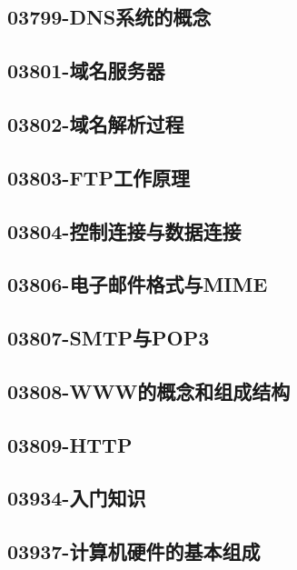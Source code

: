 \subsection{03799-DNS系统的概念}

\subsection{03801-域名服务器}

\subsection{03802-域名解析过程}

\subsection{03803-FTP工作原理}

\subsection{03804-控制连接与数据连接}

\subsection{03806-电子邮件格式与MIME}

\subsection{03807-SMTP与POP3}

\subsection{03808-WWW的概念和组成结构}

\subsection{03809-HTTP}

\subsection{03934-入门知识}

\subsection{03937-计算机硬件的基本组成}

